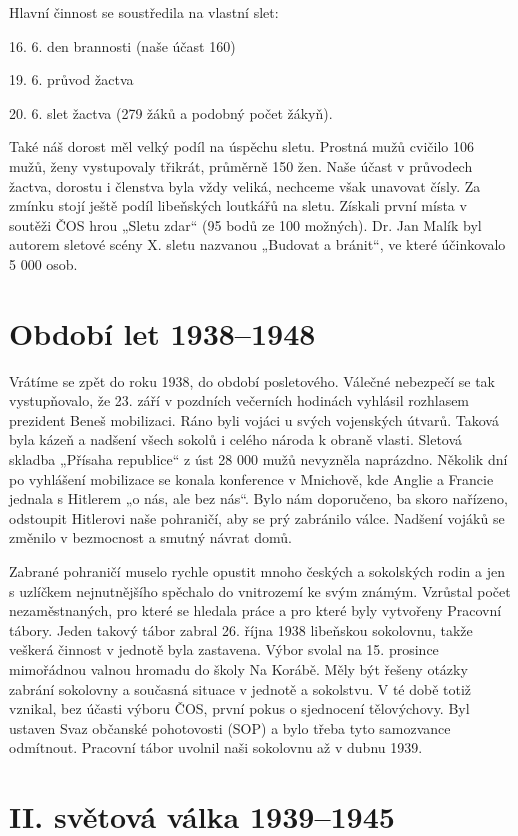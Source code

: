Hlavní činnost se soustředila na vlastní slet:

16. 6. den brannosti (naše účast 160)

19. 6. průvod žactva

20. 6. slet žactva (279 žáků a podobný počet žákyň).

Také náš dorost měl velký podíl na úspěchu sletu. Prostná mužů cvičilo
106 mužů, ženy vystupovaly třikrát, průměrně 150 žen. Naše účast v
průvodech žactva, dorostu i členstva byla vždy veliká, nechceme však
unavovat čísly. Za zmínku stojí ještě podíl libeňských loutkářů na
sletu. Získali první místa v soutěži ČOS hrou „Sletu zdar`` (95 bodů ze
100 možných). Dr. Jan Malík byl autorem sletové scény X. sletu nazvanou
„Budovat a bránit``, ve které účinkovalo 5 000 osob.

\section{Období let 1938--1948}\label{obdobuxed-let-19381948}

Vrátíme se zpět do roku 1938, do období posletového. Válečné nebezpečí
se tak vystupňovalo, že 23. září v pozdních večerních hodinách vyhlásil
rozhlasem prezident Beneš mobilizaci. Ráno byli vojáci u svých
vojenských útvarů. Taková byla kázeň a nadšení všech sokolů i celého
národa k obraně vlasti. Sletová skladba „Přísaha republice`` z úst 28
000 mužů nevyzněla naprázdno. Několik dní po vyhlášení mobilizace se
konala konference v Mnichově, kde Anglie a Francie jednala s Hitlerem „o
nás, ale bez nás``. Bylo nám doporučeno, ba skoro nařízeno, odstoupit
Hitlerovi naše pohraničí, aby se prý zabránilo válce. Nadšení vojáků se
změnilo v bezmocnost a smutný návrat domů.

Zabrané pohraničí muselo rychle opustit mnoho českých a sokolských rodin
a jen s uzlíčkem nejnutnějšího spěchalo do vnitrozemí ke svým známým.
Vzrůstal počet nezaměstnaných, pro které se hledala práce a pro které
byly vytvořeny Pracovní tábory. Jeden takový tábor zabral 26. října 1938
libeňskou sokolovnu, takže veškerá činnost v jednotě byla zastavena.
Výbor svolal na 15. prosince mimořádnou valnou hromadu do školy Na
Korábě. Měly být řešeny otázky zabrání sokolovny a současná situace v
jednotě a sokolstvu. V té době totiž vznikal, bez účasti výboru ČOS,
první pokus o sjednocení tělovýchovy. Byl ustaven Svaz občanské
pohotovosti (SOP) a bylo třeba tyto samozvance odmítnout. Pracovní tábor
uvolnil naši sokolovnu až v dubnu 1939.

\section{II. světová válka
1939--1945}\label{ii.-svux11btovuxe1-vuxe1lka-19391945}

